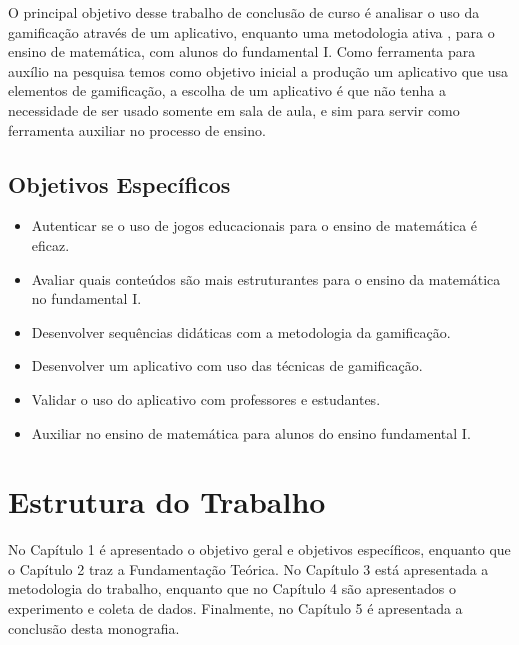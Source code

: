  O principal objetivo desse trabalho de conclusão de curso é analisar o uso da gamificação através de um aplicativo,  enquanto uma metodologia ativa , para o ensino de matemática, com  alunos do fundamental I. Como ferramenta para auxílio na pesquisa temos como objetivo inicial a produção um aplicativo que usa elementos de gamificação, a escolha de um aplicativo é que não tenha a necessidade de ser usado somente em sala de aula, e sim para servir como ferramenta auxiliar no processo de ensino.


\subsection{Objetivos Específicos}

\begin{itemize}
\item{Autenticar se o uso de jogos educacionais para o ensino de matemática é eficaz.
}
\item {Avaliar quais conteúdos são mais estruturantes para o ensino da matemática no fundamental I.
} 
\item {Desenvolver sequências didáticas com a metodologia da gamificação.
 }  
\item {Desenvolver um aplicativo com uso das técnicas de gamificação.
}
\item {Validar o uso do aplicativo com professores e estudantes.
}
\item {Auxiliar no ensino de matemática para alunos do ensino fundamental I.
}
\end{itemize}

\section{Estrutura do Trabalho}

No Capítulo 1 é apresentado o objetivo geral e objetivos específicos, enquanto que o Capítulo 2 traz a Fundamentação Teórica. No Capítulo 3 está apresentada a metodologia do trabalho, enquanto que no Capítulo 4 são apresentados o experimento e coleta de dados. Finalmente, no Capítulo 5 é apresentada a conclusão desta monografia.



